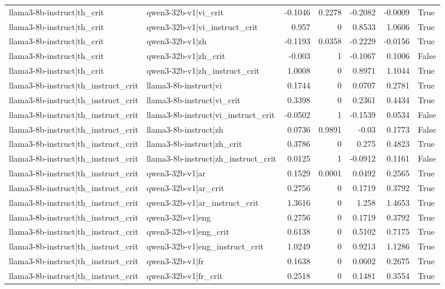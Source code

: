 \begin{table}
\begin{tabular}{l l r r r r l}
llama3-8b-instruct|th_crit & qwen3-32b-v1|vi_crit & -0.1046 & 0.2278 & -0.2082 & -0.0009 & True \\
llama3-8b-instruct|th_crit & qwen3-32b-v1|vi_instruct_crit & 0.957 & 0 & 0.8533 & 1.0606 & True \\
llama3-8b-instruct|th_crit & qwen3-32b-v1|zh & -0.1193 & 0.0358 & -0.2229 & -0.0156 & True \\
llama3-8b-instruct|th_crit & qwen3-32b-v1|zh_crit & -0.003 & 1 & -0.1067 & 0.1006 & False \\
llama3-8b-instruct|th_crit & qwen3-32b-v1|zh_instruct_crit & 1.0008 & 0 & 0.8971 & 1.1044 & True \\
llama3-8b-instruct|th_instruct_crit & llama3-8b-instruct|vi & 0.1744 & 0 & 0.0707 & 0.2781 & True \\
llama3-8b-instruct|th_instruct_crit & llama3-8b-instruct|vi_crit & 0.3398 & 0 & 0.2361 & 0.4434 & True \\
llama3-8b-instruct|th_instruct_crit & llama3-8b-instruct|vi_instruct_crit & -0.0502 & 1 & -0.1539 & 0.0534 & False \\
llama3-8b-instruct|th_instruct_crit & llama3-8b-instruct|zh & 0.0736 & 0.9891 & -0.03 & 0.1773 & False \\
llama3-8b-instruct|th_instruct_crit & llama3-8b-instruct|zh_crit & 0.3786 & 0 & 0.275 & 0.4823 & True \\
llama3-8b-instruct|th_instruct_crit & llama3-8b-instruct|zh_instruct_crit & 0.0125 & 1 & -0.0912 & 0.1161 & False \\
llama3-8b-instruct|th_instruct_crit & qwen3-32b-v1|ar & 0.1529 & 0.0001 & 0.0492 & 0.2565 & True \\
llama3-8b-instruct|th_instruct_crit & qwen3-32b-v1|ar_crit & 0.2756 & 0 & 0.1719 & 0.3792 & True \\
llama3-8b-instruct|th_instruct_crit & qwen3-32b-v1|ar_instruct_crit & 1.3616 & 0 & 1.258 & 1.4653 & True \\
llama3-8b-instruct|th_instruct_crit & qwen3-32b-v1|eng & 0.2756 & 0 & 0.1719 & 0.3792 & True \\
llama3-8b-instruct|th_instruct_crit & qwen3-32b-v1|eng_crit & 0.6138 & 0 & 0.5102 & 0.7175 & True \\
llama3-8b-instruct|th_instruct_crit & qwen3-32b-v1|eng_instruct_crit & 1.0249 & 0 & 0.9213 & 1.1286 & True \\
llama3-8b-instruct|th_instruct_crit & qwen3-32b-v1|fr & 0.1638 & 0 & 0.0602 & 0.2675 & True \\
llama3-8b-instruct|th_instruct_crit & qwen3-32b-v1|fr_crit & 0.2518 & 0 & 0.1481 & 0.3554 & True \\

\end{tabular}
\end{table}

